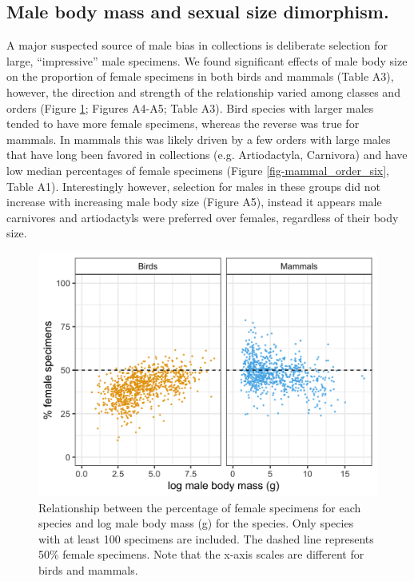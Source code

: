 \documentclass[a4paper, 12pt]{article}
\begin{document}
\subsection{Male body mass and sexual size dimorphism.}
A major suspected source of male bias in collections is deliberate selection for large, ``impressive'' male specimens. 
We found significant effects of male body size on the proportion of female specimens in both birds and mammals (Table A3), however, the direction and strength of the relationship varied among classes and orders (Figure \ref{fig-male-mass}; Figures A4-A5; Table A3). 
Bird species with larger males tended to have more female specimens, whereas the reverse was true for mammals. 
In mammals this was likely driven by a few orders with large males that have long been favored in collections (e.g. Artiodactyla, Carnivora) and have low median percentages of female specimens (Figure \ref{fig-mammal_order_six}, Table A1). 
Interestingly however, selection for males in these groups did not increase with increasing male body size (Figure A5), instead it appears male carnivores and artiodactyls were preferred over females, regardless of their body size.

\begin{figure}
 \centering
  \includegraphics[width = \linewidth]{figures/male-mass-all.png}
  \caption{Relationship between the percentage of female specimens for each species and log male body mass (g) for the species. 
  Only species with at least 100 specimens are included. 
  The dashed line represents 50\% female specimens. 
  Note that the x-axis scales are different for birds and mammals.
}
  \label{fig-male-mass}
\end{figure}
\end{document}
